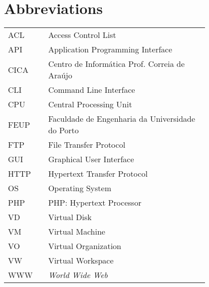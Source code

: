 \chapter*{Abbreviations}

\begin{flushleft}
\begin{tabular}{l p{0.8\linewidth}}
ACL	 & Access Control List\\
API	 & Application Programming Interface\\
CICA	 & Centro de Informática Prof. Correia de Araújo\\
CLI	 & Command Line Interface\\
CPU	 & Central Processing Unit\\
FEUP	 & Faculdade de Engenharia da Universidade do Porto\\
FTP	 & File Transfer Protocol\\
GUI	 & Graphical User Interface\\
HTTP	 & Hypertext Transfer Protocol\\
OS	 & Operating System\\
PHP	 & PHP: Hypertext Processor\\
VD	 & Virtual Disk\\
VM	 & Virtual Machine\\
VO	 & Virtual Organization\\
VW	 & Virtual Workspace\\
WWW      & \emph{World Wide Web}
\end{tabular}
\end{flushleft}

